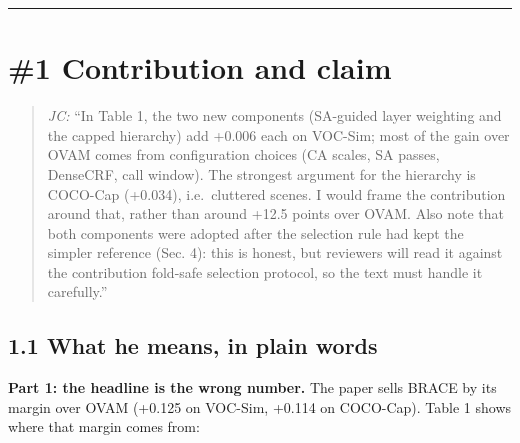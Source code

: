 \documentclass[
  10pt,
]{article}
\begin{document}
\begin{center}\rule{0.5\linewidth}{0.5pt}\end{center}

\section{\#1 Contribution and claim}

\begin{quote}
\emph{JC:} ``In Table 1, the two new components (SA-guided layer
weighting and the capped hierarchy) add +0.006 each on VOC-Sim; most of
the gain over OVAM comes from configuration choices (CA scales, SA
passes, DenseCRF, call window). The strongest argument for the hierarchy
is COCO-Cap (+0.034), i.e.~cluttered scenes. I would frame the
contribution around that, rather than around \guillemotleft{}+12.5 points over OVAM\guillemotright{}.
Also note that both components were adopted after the selection rule had
kept the simpler reference (Sec. 4): this is honest, but reviewers will
read it against the contribution \guillemotleft{}fold-safe selection protocol\guillemotright{}, so the
text must handle it carefully.''
\end{quote}

\subsection{1.1 What he means, in plain words}

\textbf{Part 1: the headline is the wrong number.} The paper sells BRACE
by its margin over OVAM (+0.125 on VOC-Sim, +0.114 on COCO-Cap). Table 1
shows where that margin comes from:
\end{document}
